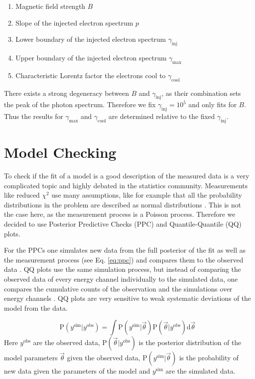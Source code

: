 \documentclass[twocolumn,traditabstract]{aa}
\begin{document}
\begin{enumerate}
	\item Magnetic field strength $B$
  \item Slope of the injected electron spectrum $p$
  \item Lower boundary of the injected electron spectrum $\gamma_{\mathrm{inj}}$
  \item Upper boundary of the injected electron spectrum $\gamma_{\mathrm{max}}$
  \item Characteristic Lorentz factor the electrons cool to $\gamma_{\mathrm{cool}}$
\end{enumerate}

There exists a strong degeneracy between $B$ and $\gamma_{\mathrm{inj}}$, as their combination sets the peak of the photon spectrum. Therefore we fix $\gamma_{\mathrm{inj}}=10^{5}$ and only fits for $B$. Thus the results for $\gamma_{\mathrm{max}}$ and $\gamma_{\mathrm{cool}}$ are determined relative to the fixed $\gamma_{\mathrm{inj}}$.

\section{Model Checking}
\label{PPC}
To check if the fit of a model is a good description of the measured data is a very complicated topic and highly debated in the statistics community. Measurements like reduced $\chi^{2}$ use many assumptions, like for example that all the probability distributions in the problem are described as normal distributions \citep{dosanddonts}. This is not the case here, as the measurement process is a Poisson process. Therefore we decided to use Posterior Predictive Checks (PPC) and Quantile-Quantile (QQ) plots.

For the PPCs one simulates new data from the full posterior of the fit as well as the measurement process (see Eq. \ref{eq:ppc}) and compares them to the observed data \citep{ppc}. QQ plots use the same simulation process, but instead of comparing the observed data of every energy channel individually to the simulated data, one compares the cumulative counts of the observation and the simulations over energy channels  \citep{QQ}. QQ plots are very sensitive to weak systematic deviations of the model from the data.

\begin{equation}
  \textrm{P}(y^{\textrm{sim}}|y^{\textrm{obs}}) = \int \textrm{P}(y^{\textrm{sim}}|\vec{\theta}) \textrm{P}(\vec{\theta}|y^{\textrm{obs}}) \mathrm{d}\vec{\theta}
  \label{eq:ppc}
\end{equation}
\noindent
Here $y^{\textrm{obs}}$ are the observed data, $\textrm{P}(\vec{\theta}|y^{\textrm{obs}})$ is the posterior distribution of the model parameters $\vec{\theta}$ given the observed data, $\textrm{P}(y^{\textrm{sim}}|\vec{\theta})$ is the probability of new data given the parameters of the model and $y^{\textrm{sim}}$ are the simulated data.
\end{document}
